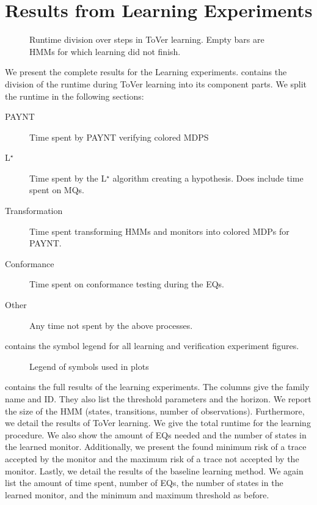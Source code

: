 \documentclass[runningheads]{llncs}
\newcommand{\alg}{ToVer\xspace}
\begin{document}
\begin{scriptsize}
    \setlength\LTleft{-4cm}
    
\end{scriptsize}

\section{Results from Learning Experiments}\label{sec:reslearn}
\begin{figure}[t]
    \resizebox{\linewidth}{!}{
        }
    \caption{Runtime division over steps in \alg learning. Empty bars are HMMs for which learning did not finish.}
    \label{fig:runtimediv}

\end{figure}
We present the complete results for the Learning experiments.  contains the division of the runtime during \alg learning into its component parts. We split the runtime in the following sections:
\begin{description}
    \item[PAYNT] Time spent by PAYNT verifying colored MDPS
    \item[L$^\star$] Time spent by the L$^\star$ algorithm creating a hypothesis. Does include time spent on MQs.
    \item[Transformation] Time spent transforming HMMs and monitors into colored MDPs for PAYNT.
    \item[Conformance] Time spent on conformance testing during the EQs.
    \item[Other] Any time not spent by the above processes.
\end{description}

 contains the symbol legend for all learning and verification experiment figures.

\begin{figure}
    \centerline{
        \resizebox{.5\linewidth}{!}{
            }
    }
    \caption{Legend of symbols used in plots}
    \label{fig:legend}
\end{figure}

 contains the full results of the learning experiments. The columns give the family name and ID. They also list the threshold parameters and the horizon. We report the size of the HMM (states, transitions, number of observations). Furthermore, we detail the results of \alg learning. We give the total runtime for the learning procedure. We also show the amount of EQs needed and the number of states in the learned monitor. Additionally, we present the found minimum risk of a trace accepted by the monitor and the maximum risk of a trace not accepted by the monitor. Lastly, we detail the results of the baseline learning method. We again list the amount of time spent, number of EQs, the number of states in the learned monitor, and the minimum and maximum threshold as before.
\end{document}
